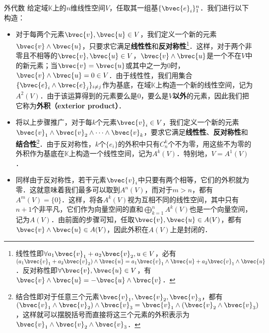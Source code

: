 \begin{example}{外代数}
给定域$\mathbb{K}$上的$n$维线性空间$V$，任取其一组基$\{\bvec{e}_i\}^n_{1}$．我们进行以下构造：
\begin{itemize}
\item 对于每两个元素$\bvec{v}, \bvec{u}\in V$，我们定义一个新的元素$\bvec{v}\wedge \bvec{u}$，只要求它满足\textbf{线性性}和\textbf{反对称性}\footnote{线性性即$\forall a_1\bvec{v}_1+a_2\bvec{v}_2,{u}\in V$，必有$(a_1\bvec{v}_1+a_2\bvec{v}_2)\wedge\bvec{u}=a_1\bvec{v}_1\wedge\bvec{u}+a_2\bvec{v}_1\wedge\bvec{u}$．反对称性即$\forall \bvec{v}, \bvec{u}\in V$，有$\bvec{v}\wedge\bvec{u}=-\bvec{u}\wedge\bvec{v}$．}．这样，对于两个非零且不相等的$\bvec{v},\bvec{u}\in V$，$\bvec{v}\wedge \bvec{u}$是一个不在$V$中的新元素；当$\bvec{v}=\bvec{u}$或其中之一为$0$时，$\bvec{v}\wedge \bvec{u}=0\in V$．由于线性性，我们用集合$\{\bvec{e}_i\wedge \bvec{e}_j\}_{i\not=j}$作为基底，在域$\mathbb{K}$上构造一个新的线性空间，记为$A^2(V)$．由于该运算得到的元素要么是$0$，要么是$V$\textbf{以外}的元素，因此我们把它称为\textbf{外积（exterior product）}．

\item 将以上步骤推广，对于每$k$个元素$\bvec{v}_i\in V$，我们定义一个新的元素$\bvec{v}_1\wedge \bvec{v}_2\wedge\cdots\wedge \bvec{v}_k$，要求它满足\textbf{线性性}、\textbf{反对称性}和\textbf{结合性}\footnote{结合性即对于任意三个元素$\bvec{v}_1,\bvec{v}_2,\bvec{v}_3$，都有$(\bvec{v}_1\wedge \bvec{v}_2)\wedge \bvec{v}_3=\bvec{v}_1\wedge(\bvec{v}_2\wedge \bvec{v}_3)$，这样就可以摆脱括号而直接将这三个元素的外积表示为$\bvec{v}_1\wedge \bvec{v}_2\wedge \bvec{v}_3$．}．由于反对称性，$k$个$\{e_i\}$的外积中只有$C^k_n$个不为零，用这些不为零的外积作为基底在$\mathbb{K}$上构造一个线性空间，记为$A^k(V)$．特别地，$V=A^1(V)$．

\item 同样由于反对称性，若干元素$\bvec{v}_i$中只要有两个相等，它们的外积就为零．这就意味着我们最多可以取到$A^n(V)$，而对于$m>n$，都有$A^m(V)=\{0\}$．这样，将各$A^k(V)$视为互相不同的线性空间，其中只有$n+1$个非平凡，它们作为向量空间的直和$\bigoplus\limits_{k=1}^n A^k(V)$也是一个向量空间，记为$A(V)$．由前面的步骤可知，任取$\bvec{v}, \bvec{u}\in A(V)$，都有$\bvec{v}\wedge\bvec{u}\in A(V)$，因此外积在$A(V)$上是封闭的．
\end{itemize}


\end{example}
